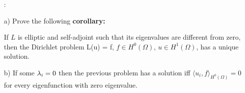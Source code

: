 \ejer:

\noi 
a) Prove the following {\bf corollary:}

If $L$ is elliptic and self-adjoint such that its eigenvalues are
different from zero, then the Dirichlet problem
\beq
L(u) = f,
\eeq
$f\in H^0(\Omega)$, $u \in H^1(\Omega)$,
has a unique solution.

\noi 
b) If some $\mbox{$\lambda$}_i = 0$ then the previous problem has a solution 
iff $\langle u_i , f \rangle_{H^0(\Omega)} = 0$ 
for every eigenfunction with zero eigenvalue.

